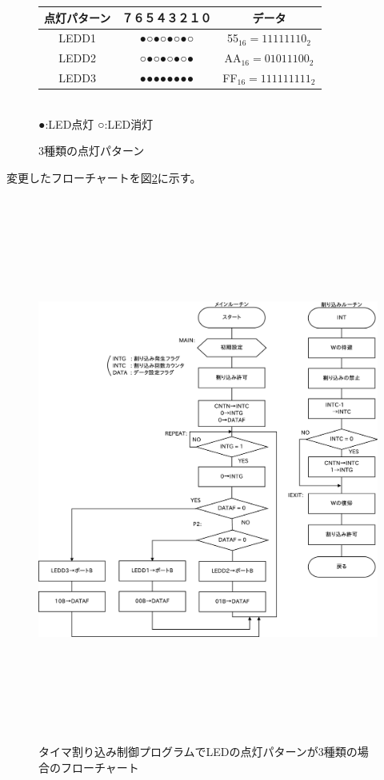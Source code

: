 \documentclass[a4paper,12pt]{ujarticle}
\begin{document}
   \begin{figure}
    \begin{center}
       \begin{tabular}{c|c|c}\hline
点灯パターン&７６５４３２１０ & データ \\ \hline
      LEDD1 &●○●○●○●○ & 55$_{16}=11111110_2$ \\
      LEDD2 &○●○●○●○● & AA$_{16}=01011100_2$ \\
      LEDD3 &●●●●●●●● & FF$_{16}=111111111_2$\\ \hline
       \end{tabular}\\
      ●:LED点灯 ○:LED消灯
    \end{center}
    \caption{3種類の点灯パターン}
    \label{fig:timer-LED3pattern}
\end{figure}

変更したフローチャートを図\ref{fig:flow_5-14-1}に示す。
  \begin{figure}[htbp]
    \begin{center}
     \includegraphics[height=180mm]{Diagram5-14-1.eps}
    \end{center}
   \caption{タイマ割り込み制御プログラムでLEDの点灯パターンが3種類の場合のフローチャート}
   \label{fig:flow_5-14-1}
  \end{figure}
\end{document}
